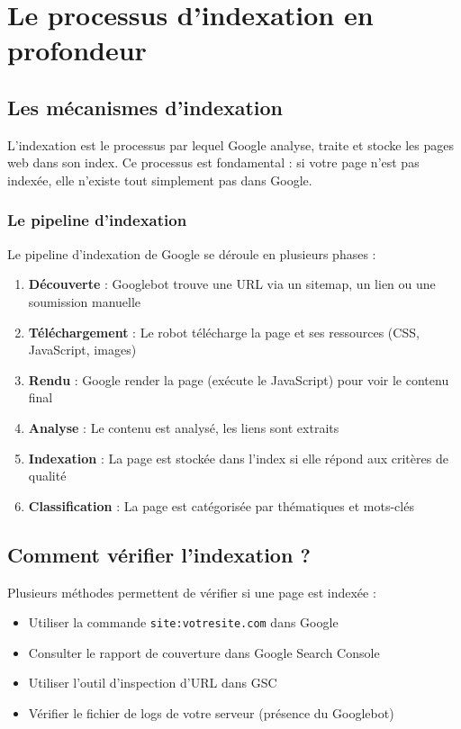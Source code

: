 \documentclass[12pt,a4paper,twoside]{report}
\begin{document}
\chapter{Le processus d'indexation en profondeur}
\label{ch:indexation}

\section{Les mécanismes d'indexation}

L'indexation est le processus par lequel Google analyse, traite et stocke les pages web dans son index. Ce processus est fondamental : si votre page n'est pas indexée, elle n'existe tout simplement pas dans Google.

\subsection{Le pipeline d'indexation}

Le pipeline d'indexation de Google se déroule en plusieurs phases :

\begin{enumerate}
    \item \textbf{Découverte} : Googlebot trouve une URL via un sitemap, un lien ou une soumission manuelle
    \item \textbf{Téléchargement} : Le robot télécharge la page et ses ressources (CSS, JavaScript, images)
    \item \textbf{Rendu} : Google render la page (exécute le JavaScript) pour voir le contenu final
    \item \textbf{Analyse} : Le contenu est analysé, les liens sont extraits
    \item \textbf{Indexation} : La page est stockée dans l'index si elle répond aux critères de qualité
    \item \textbf{Classification} : La page est catégorisée par thématiques et mots-clés
\end{enumerate}

\section{Comment vérifier l'indexation ?}

Plusieurs méthodes permettent de vérifier si une page est indexée :

\begin{itemize}
    \item Utiliser la commande \texttt{site:votresite.com} dans Google
    \item Consulter le rapport de couverture dans Google Search Console
    \item Utiliser l'outil d'inspection d'URL dans GSC
    \item Vérifier le fichier de logs de votre serveur (présence du Googlebot)
\end{itemize}
\end{document}
